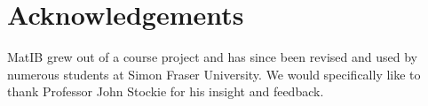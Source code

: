 \documentclass{article}
\begin{document}
\section{Acknowledgements}\label{sec:acknowledgements}

MatIB grew out of a course project and has since been revised and used by numerous students at Simon Fraser University.
We would specifically like to thank Professor John Stockie for his insight and feedback.

\newpage



\end{document}

